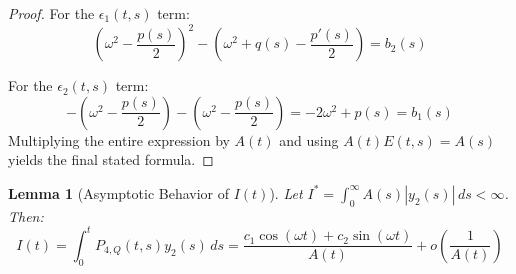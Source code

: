 \documentclass[10pt,reqno]{amsart}
\newtheorem{lemma}[theorem]{Lemma}
\theoremstyle{definition}
\begin{document}
\begin{proof}
		For the $\epsilon_1(t,s)$ term:
		\[ \left(\omega^2 - \frac{p(s)}{2}\right)^2 - \left(\omega^2 + q(s) - \frac{p'(s)}{2}\right) = b_2(s) \]
		
		For the $\epsilon_2(t,s)$ term:
		\[ -\left(\omega^2 - \frac{p(s)}{2}\right) - \left(\omega^2 - \frac{p(s)}{2}\right) = -2\omega^2 + p(s) = b_1(s) \]
		Multiplying the entire expression by $A(t)$ and using $A(t)E(t,s) = A(s)$ yields the final stated formula.
	\end{proof}
	
	\vspace{0.5cm}
	
	\begin{lemma}[Asymptotic Behavior of $I(t)$]
		Let $I^* = \int_0^\infty A(s)|y_2(s)|\,ds < \infty$. Then:
		\[ I(t) = \int_0^t P_{4,Q}(t,s)y_2(s)\,ds = \frac{c_1 \cos(\omega t) + c_2 \sin(\omega t)}{A(t)} + o\left(\frac{1}{A(t)}\right) \]
	\end{lemma}
	
\end{document}
